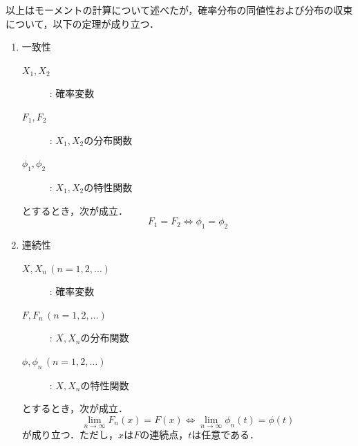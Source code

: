 \documentclass{jsreport}
\begin{document}
以上はモーメントの計算について述べたが，確率分布の同値性および分布の収束について，以下の定理が成り立つ．

\begin{screen}
  \begin{theo}
    \begin{enumerate}
      \item 一致性
      \begin{description}
        \item[$X_1, X_2$] : 確率変数
        \item[$F_1, F_2$] : $X_1, X_2$の分布関数
        \item[$\phi_1, \phi_2$] : $X_1, X_2$の特性関数
      \end{description}
      とするとき，次が成立．
      \begin{equation}
        F_1 = F_2 \Longleftrightarrow \phi_1 = \phi_2 \nonumber
      \end{equation}
      \item 連続性
      \begin{description}
        \item[$X, X_n \, (n = 1, 2, \ldots)$] : 確率変数
        \item[$F, F_n \, (n = 1, 2, \ldots)$] : $X, X_n$の分布関数
        \item[$\phi, \phi_n \, (n = 1, 2, \ldots)$] : $X, X_n$の特性関数
      \end{description}
      とするとき，次が成立．
      \begin{equation}
        \lim_{n \to \infty} F_n(x) = F(x) \Longleftrightarrow \lim_{n \to \infty} \phi_n(t) = \phi(t) \nonumber
      \end{equation}
      が成り立つ．ただし，$x$は$F$の連続点，$t$は任意である．
    \end{enumerate}
  \end{theo}
\end{screen}
\end{document}
